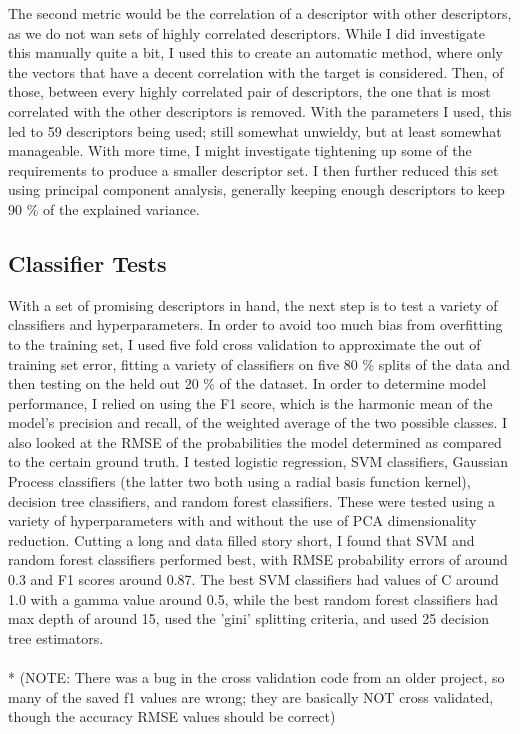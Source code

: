 \documentclass[11pt]{article}
\begin{document}
\noindent The second metric would be the correlation of a descriptor with other descriptors, as we do not wan sets of highly correlated descriptors. While I did investigate this manually quite a bit, I used this to create an automatic method, where only the vectors that have a decent correlation with the target is considered. Then, of those, between every highly correlated pair of descriptors, the one that is most correlated with the other descriptors is removed. With the parameters I used, this led to 59 descriptors being used; still somewhat unwieldy, but at least somewhat manageable. With more time, I might investigate tightening up some of the requirements to produce a smaller descriptor set. I then further reduced this set using principal component analysis, generally keeping enough descriptors to keep 90 \% of the explained variance. 

\subsection{Classifier Tests}

\noindent With a set of promising descriptors in hand, the next step is to test a variety of classifiers and hyperparameters. In order to avoid too much bias from overfitting to the training set, I used five fold cross validation to approximate the out of training set error, fitting a variety of classifiers on five 80 \% splits of the data and then testing on the held out 20 \% of the dataset. In order to determine model performance, I relied on using the F1 score, which is the harmonic mean of the model's precision and recall, of the weighted average of the two possible classes. I also looked at the RMSE of the probabilities the model determined as compared to the certain ground truth. I tested logistic regression, SVM classifiers, Gaussian Process classifiers (the latter two both using a radial basis function kernel), decision tree classifiers, and random forest classifiers. These were tested using a variety of hyperparameters with and without the use of PCA dimensionality reduction. Cutting a long and data filled story short, I found that SVM and random forest classifiers performed best, with RMSE probability errors of around 0.3 and F1 scores around 0.87. The best SVM classifiers had values of C around 1.0 with a gamma value around 0.5, while the best random forest classifiers had max depth of around 15, used the 'gini' splitting criteria, and used 25 decision tree estimators.
\\
\\*
(NOTE: There was a bug in the cross validation code from an older project, so many of the saved f1 values are wrong; they are basically NOT cross validated, though the accuracy RMSE values should be correct)
\end{document}
